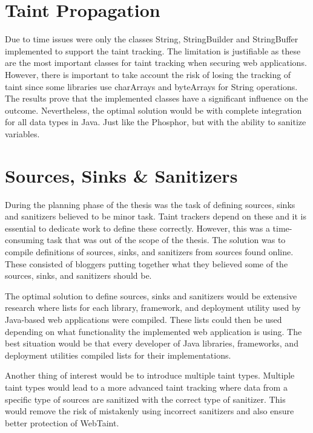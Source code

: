 \section{Taint Propagation}
\label{propagation}
Due to time issues were only the classes String, StringBuilder and StringBuffer implemented to support the taint tracking. The limitation is justifiable as these are the most important classes for taint tracking when securing web applications. However, there is important to take account the risk of losing the tracking of taint since some libraries use charArrays and byteArrays for String operations. The results prove that the implemented classes have a significant influence on the outcome. Nevertheless, the optimal solution would be with complete integration for all data types in Java. Just like the Phosphor, but with the ability to sanitize variables.



\section{Sources, Sinks \& Sanitizers}
\label{sss}
During the planning phase of the thesis was the task of defining sources, sinks and sanitizers believed to be minor task. Taint trackers depend on these and it is essential to dedicate work to define these correctly. However, this was a time-consuming task that was out of the scope of the thesis. The solution was to compile definitions of sources, sinks, and sanitizers from sources found online. These consisted of bloggers putting together what they believed some of the sources, sinks, and sanitizers should be.

The optimal solution to define sources, sinks and sanitizers would be extensive research where lists for each library, framework, and deployment utility used by Java-based web applications were compiled. These lists could then be used depending on what functionality the implemented web application is using. The best situation would be that every developer of Java libraries, frameworks, and deployment utilities compiled lists for their implementations.

Another thing of interest would be to introduce multiple taint types. Multiple taint types would lead to a more advanced taint tracking where data from a specific type of sources are sanitized with the correct type of sanitizer. This would remove the risk of mistakenly using incorrect sanitizers and also ensure better protection of WebTaint.



